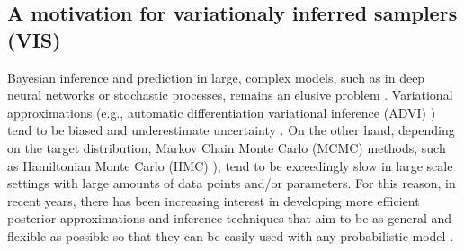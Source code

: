 \subsection{A motivation for variationaly inferred samplers (VIS)}
Bayesian inference and prediction in large, complex models, such as in 
deep neural networks or stochastic processes, remains an elusive problem \cite{blei2017variational,insua2012bayesian,alquier2020approximate}.
%
%
%
Variational approximations (e.g., automatic differentiation variational inference (ADVI) \cite{kucukelbir2017automatic}) tend to be biased and 
underestimate uncertainty \cite{riquelme2018failure}. 
On the other hand, depending on the target distribution,
Markov Chain Monte Carlo (MCMC) \cite{andrieu2010particle} 
methods, such 
as Hamiltonian Monte Carlo (HMC) \cite{neal2011mcmc}),   
tend to be exceedingly slow  \cite{van2018simple} {in large scale settings with large amounts of data points and/or parameters}. For this reason, in recent years, there has been increasing interest in developing more efficient posterior approximations \cite{nalisnick2016approximate,salimans2015markov,tran2015variational} and inference techniques that aim to be as general and flexible as possible {so that they can be easily used with any probabilistic model} \cite{wood2014new, ge2018t}.

